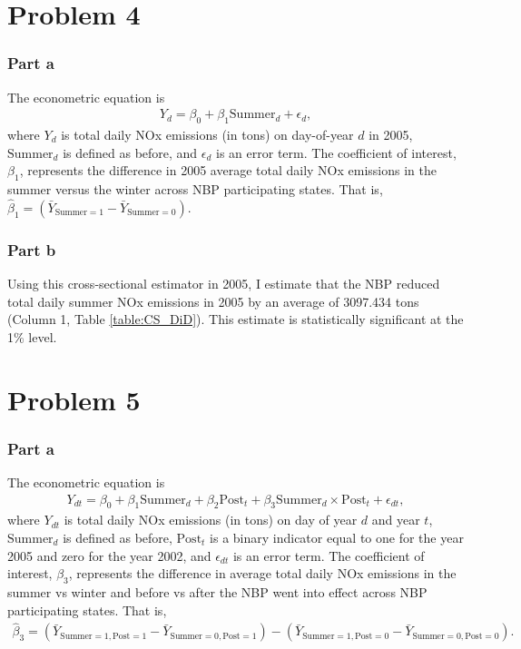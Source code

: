 \documentclass[12pt]{article}
\begin{document}
\section*{Problem 4}

\subsubsection*{Part a}
The econometric equation is
\begin{align}
	Y_d = \beta_0 + \beta_1 \text{Summer}_d + \epsilon_d,
\end{align}
where $Y_{d}$ is total daily NOx emissions (in tons) on day-of-year $d$ in 2005, $\text{Summer}_d$ is defined as before, and $\epsilon_d$ is an error term. The coefficient of interest, $\beta_1$, represents the difference in 2005 average total daily NOx emissions in the summer versus the winter across NBP participating states. That is, $\hat{\beta}_1 = (\bar{Y}_{\text{Summer}=1} - \bar{Y}_{\text{Summer}=0})$.

\subsubsection*{Part b}
Using this cross-sectional estimator in 2005, I estimate that the NBP reduced total daily summer NOx emissions in 2005 by an average of 3097.434 tons (Column 1, Table \ref{table:CS_DiD}). This estimate is statistically significant at the 1\% level.

\section*{Problem 5}

\subsubsection*{Part a}
The econometric equation is
\begin{align}
	Y_{dt} = \beta_0 + \beta_1 \text{Summer}_d + \beta _2\text{Post}_t + \beta_3 \text{Summer}_d \times \text{Post}_t + \epsilon_{dt},
\end{align}
where $Y_{dt}$ is total daily NOx emissions (in tons) on day of year $d$ and year $t$, $\text{Summer}_d$ is defined as before, $\text{Post}_t$ is a binary indicator equal to one for the year 2005 and zero for the year 2002, and $\epsilon_{dt}$ is an error term. The coefficient of interest, $\beta_3$, represents the difference in average total daily NOx emissions in the summer vs winter and before vs after the NBP went into effect across NBP participating states. That is, 
\begin{align*}
	\hat{\beta}_3 = (\bar{Y}_{\text{Summer}=1, \text{Post} = 1} -  \bar{Y}_{\text{Summer}=0, \text{Post} = 1}) - (\bar{Y}_{\text{Summer}=1, \text{Post} = 0} - \bar{Y}_{\text{Summer}=0, \text{Post} = 0}).
\end{align*}
\end{document}
